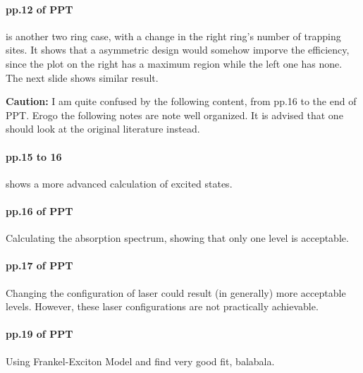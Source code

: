 \documentclass{article}
\numberwithin{equation}{subsection} %
\theoremstyle{definition}
\begin{document}
\paragraph{pp.12 of PPT} is 
another two ring case, with a change in the right ring's number
of trapping sites. It shows that a asymmetric design would somehow
imporve the efficiency, since the plot on the right has a maximum region
while the left one has none. The next slide shows similar result.

\textbf{Caution:} I am quite confused by the following content,
from pp.16 to the end of PPT. Erogo the
following notes are note well organized. It is advised that one should
look at the original literature instead.

\paragraph{pp.15 to 16} shows a more advanced calculation of excited
states.

\paragraph{pp.16 of PPT} Calculating the absorption spectrum, 
showing that only one level is acceptable.

\paragraph{pp.17 of PPT}
Changing the configuration of laser could result (in generally) more
acceptable levels. However, these laser configurations are not practically
achievable.

\paragraph{pp.19 of PPT}
Using Frankel-Exciton Model and find very good fit, balabala.
\end{document}
